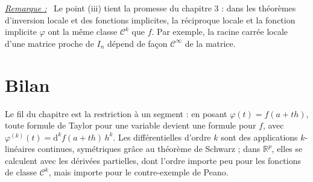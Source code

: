 \documentclass[a4paper,twoside]{report}
\newenvironment{remarque}%
 {\par\needspace{6\baselineskip}\vspace{1mm}\begin{list}{}{\leftmargin=1cm \rightmargin=0.5cm}\item[]%
  \textit{\underline{Remarque :}}~}%
 {\end{list}\vspace{1mm}}
\newcommand{\R}{\mathbb{R}}
\newcommand{\dd}{\mathrm{d}}                      %
\newcommand{\Cc}{\mathcal{C}}                     %
\begin{document}
\begin{remarque}
Le point (iii) tient la promesse du chapitre 3 : dans les théorèmes d'inversion locale et des fonctions implicites, la réciproque locale et la fonction implicite $\varphi$ ont la même classe $\Cc^{k}$ que $f$. Par exemple, la racine carrée locale d'une matrice proche de $I_{n}$ dépend de façon $\Cc^{\infty}$ de la matrice.
\end{remarque}
\newpage
\section{Bilan}

Le fil du chapitre est la restriction à un segment : en posant $\varphi(t) = f(a + th)$, toute formule de Taylor pour une variable devient une formule pour $f$, avec $\varphi^{(k)}(t) = \dd^{k} f(a + th)\,h^{k}$. Les différentielles d'ordre $k$ sont des applications $k$-linéaires continues, symétriques grâce au théorème de Schwarz ; dans $\R^{p}$, elles se calculent avec les dérivées partielles, dont l'ordre importe peu pour les fonctions de classe $\Cc^{k}$, mais importe pour le contre-exemple de Peano.
\end{document}
